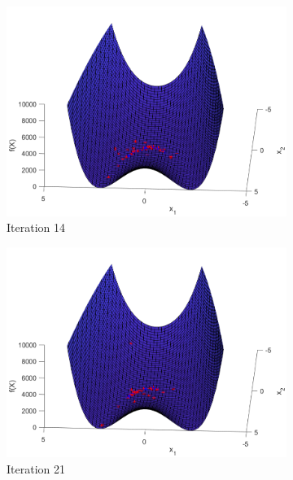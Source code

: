\begin{figure}
\begin{subfigure}[b]{0.4\textwidth}
    \includegraphics[width=\textwidth]{img/smpl/rosn2d-1-100/loa-iter-14}
    \caption{Iteration 14}
    \label{fig:s5-iter-2}
  \end{subfigure}
  \begin{subfigure}[b]{0.4\textwidth}
    \includegraphics[width=\textwidth]{img/smpl/rosn2d-1-100/loa-iter-21}
    \caption{Iteration 21}
    \label{fig:s5-iter-3}
  \end{subfigure}
  \begin{subfigure}[b]{0.4\textwidth}

\end{subfigure}
\end{figure}
